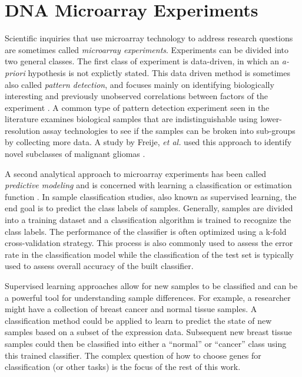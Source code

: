 \section{DNA Microarray Experiments}

Scientific inquiries that use microarray technology to address research
questions are sometimes called \emph{microarray experiments}.  Experiments can
be divided into two general classes.  The first class of experiment is
data-driven, in which an \emph{a-priori} hypothesis is not explictly stated.
This data driven method is sometimes also called \emph{pattern detection}, and
focuses mainly on identifying biologically interesting and previously
unobserved correlations between factors of the experiment
\cite{Dubitzky2003IMD}.  A common type of pattern detection experiment seen in
the literature examines biological samples that are indistinguishable using
lower-resolution assay technologies to see if the samples can be broken into
sub-groups by collecting more data.   A study by Freije, \emph{et al.} used
this approach to identify novel subclasses of malignant gliomas
\cite{PMID_15374961}.

A second analytical approach to microarray experiments has been called
\emph{predictive modeling} and is concerned with learning a classification or
estimation function \cite{Dubitzky2003IMD}. In sample classification studies, also
known as supervised learning, the end goal is to predict the class labels of
samples. Generally, samples are divided into a training dataset and a
classification algorithm is trained to recognize the class labels. The
performance of the classifier is often optimized using a k-fold
cross-validation strategy.  This process is also commonly used to assess the
error rate in the classification model while the classification of the test set
is typically used to assess overall accuracy of the built classifier.

Supervised learning approaches allow for new samples to be classified and 
can be a powerful tool for understanding sample differences. For example, a
researcher might have a collection of breast cancer and normal tissue samples.
A classification method could be applied to learn to predict the state of new
samples based on a subset of the expression data.  Subsequent new breast tissue
samples could then be classified into either a ``normal'' or ``cancer'' class using
this trained classifier. The complex question of how to choose genes for
classification (or other tasks) is the focus of the rest of this work.

